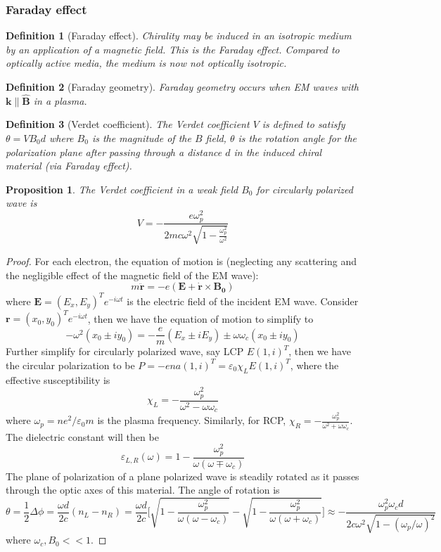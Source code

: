 \documentclass[a4paper]{article}
\theoremstyle{new}
\newtheorem{defi}{Definition}[section]
\newtheorem{prop}{Proposition}[section]
\begin{document}
\subsubsection{Faraday effect}
\begin{defi}[Faraday effect]
Chirality may be induced in an isotropic medium by an application of a magnetic field. This is the Faraday effect. Compared to optically active media, the medium is now not optically isotropic.
\end{defi}
\begin{defi}[Faraday geometry]
Faraday geometry occurs when EM waves with $\mathbf{k}\parallel\mathbf{\hat{B}}$ in a plasma.
\end{defi}
\begin{defi}[Verdet coefficient]
The Verdet coefficient $V$ is defined to satisfy $\theta=VB_0d$ where $B_0$ is the magnitude of the $B$ field, $\theta$ is the rotation angle for the polarization plane after passing through a distance $d$ in the induced chiral material (via Faraday effect).
\end{defi}
\begin{prop}
The Verdet coefficient in a weak field $B_0$ for circularly polarized wave is
$$V=-\frac{e\omega_p^2}{2mc\omega^2\sqrt{1-\frac{\omega_p^2}{\omega^2}}}$$
\end{prop}
\begin{proof}
For each electron, the equation of motion is (neglecting any scattering and the negligible effect of the magnetic field of the EM wave):
$$m\mathbf{\ddot{r}}=-e(\mathbf{E}+\mathbf{\dot{r}}\times\mathbf{B_0})$$
where $\mathbf{E}=(E_x,E_y)^Te^{-i\omega t}$ is the electric field of the incident EM wave. Consider $\mathbf{r}=(x_0,y_0)^Te^{-i\omega t}$, then we have the equation of motion to simplify to
$$-\omega^2(x_0\pm iy_0)=-\frac{e}{m}(E_x\pm iE_y)\pm\omega\omega_c(x_0\pm iy_0)$$
Further simplify for circularly polarized wave, say LCP $E(1,i)^T$, then we have the circular polarization to be $P=-ena(1,i)^T=\varepsilon_0\chi_LE(1,i)^T$, where the effective susceptibility is 
$$\chi_L=-\frac{\omega_p^2}{\omega^2-\omega\omega_c}$$
where $\omega_p=ne^2/\varepsilon_0m$ is the plasma frequency. Similarly, for RCP, $\chi_R=-\frac{\omega_p^2}{\omega^2+\omega\omega_c}$. The dielectric constant will then be
$$\varepsilon_{L,R}(\omega)=1-\frac{\omega_p^2}{\omega(\omega\mp\omega_c)}$$
The plane of polarization of a plane polarized wave is steadily rotated as it passes through the optic axes of this material. The angle of rotation is
$$\theta=\frac{1}{2}\Delta\phi=\frac{\omega d}{2c}(n_L-n_R)=\frac{\omega d}{2c}\bigg[\sqrt{1-\frac{\omega_p^2}{\omega(\omega-\omega_c)}}-\sqrt{1-\frac{\omega_p^2}{\omega(\omega+\omega_c)}}\bigg]\approx-\frac{\omega_p^2\omega_cd}{2c\omega^2\sqrt{1-(\omega_p/\omega)^2}}$$
where $\omega_c,B_0<<1$.
\end{proof}
\end{document}
